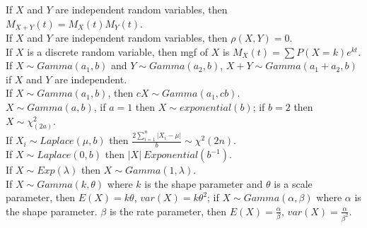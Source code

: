 \documentclass[10pt,landscape]{article}
\begin{document}
\begin{multicols}{3}
\begin{description}
If $X$ and $Y$ are independent random variables, then $M_{X+Y} (t) = M_{X}(t)M_{Y}(t)$.\\
If $X$ and $Y$ are independent random variables, then $\rho(X, Y) = 0$. \\
If $X$ is a discrete random variable,  then mgf of $X$ is $M_{X}(t) = \sum P(X = k)e^{kt}$. \\
If $X \sim Gamma(a_1,b)$ and $Y \sim Gamma(a_2,b)$, $X+Y \sim Gamma(a_1+a_2,b)$ if $X$ and $Y$ are independent. \\
If $X \sim Gamma(a_1,b)$, then $cX\sim Gamma(a_1, cb)$. \\
$X \sim Gamma(a,b)$, if $a=1$ then $X\sim exponential(b)$; if $b=2$ then $X\sim \chi_{(2a)}^2$. \\
If $X_i \sim Laplace(\mu, b)$ then $\frac{2 \sum_{i=1}^n |X_i-\mu|}{b} \sim \chi^2(2n) $.\\
If $X \sim Laplace(0, b)$ then $|X| ~ Exponential(b^{-1})$.\\
If $X \sim Exp(\lambda)$ then $X \sim Gamma(1, \lambda)$.\\
If $X \sim Gamma(k, \theta)$ where $k$ is the shape parameter and $\theta$ is a scale parameter, then $E(X) = k\theta$, $var(X) = k\theta^2$;  if $X \sim Gamma(\alpha, \beta)$ where $\alpha$ is the shape parameter. $\beta$ is the rate parameter, then $E(X) = \frac{\alpha}{\beta} $, $var(X) = \frac{\alpha}{\beta^2}$.\\

\end{description}


\end{multicols}
\end{document}
